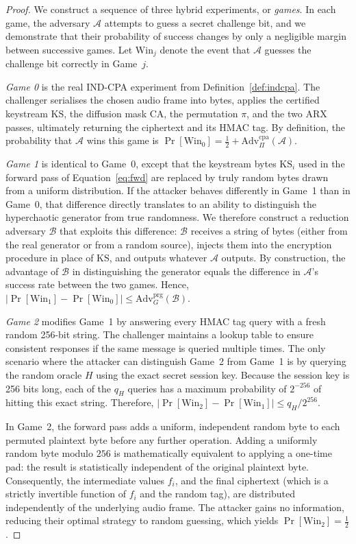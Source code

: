 \documentclass[pdflatex,sn-mathphys-num]{sn-jnl}%
\theoremstyle{thmstyleone}%
\theoremstyle{thmstyletwo}%
\theoremstyle{thmstylethree}%
\begin{document}
\begin{proof}
We construct a sequence of three hybrid experiments, or \emph{games}. In each game, the adversary $\mathcal{A}$ attempts to guess a secret challenge bit, and we demonstrate that their probability of success changes by only a negligible margin between successive games. Let $\mathrm{Win}_j$ denote the event that $\mathcal{A}$ guesses the challenge bit correctly in Game~$j$.

\emph{Game 0} is the real IND-CPA experiment from Definition~\ref{def:indcpa}. The challenger serialises the chosen audio frame into bytes, applies the certified keystream $\mathrm{KS}$, the diffusion mask $\mathrm{CA}$, the permutation $\pi$, and the two ARX passes, ultimately returning the ciphertext and its HMAC tag. By definition, the probability that $\mathcal{A}$ wins this game is $\Pr[\mathrm{Win}_0]=\tfrac12+\mathrm{Adv}^{\mathrm{cpa}}_{\Pi}(\mathcal{A})$.

\emph{Game 1} is identical to Game~0, except that the keystream bytes $\mathrm{KS}_i$ used in the forward pass of Equation~\eqref{eq:fwd} are replaced by truly random bytes drawn from a uniform distribution. If the attacker behaves differently in Game~1 than in Game~0, that difference directly translates to an ability to distinguish the hyperchaotic generator from true randomness. We therefore construct a reduction adversary $\mathcal{B}$ that exploits this difference: $\mathcal{B}$ receives a string of bytes (either from the real generator or from a random source), injects them into the encryption procedure in place of $\mathrm{KS}$, and outputs whatever $\mathcal{A}$ outputs. By construction, the advantage of $\mathcal{B}$ in distinguishing the generator equals the difference in $\mathcal{A}$'s success rate between the two games. Hence, $|\Pr[\mathrm{Win}_1]-\Pr[\mathrm{Win}_0]|\le \mathrm{Adv}^{\mathrm{prg}}_{G}(\mathcal{B})$.

\emph{Game 2} modifies Game~1 by answering every HMAC tag query with a fresh random 256-bit string. The challenger maintains a lookup table to ensure consistent responses if the same message is queried multiple times. The only scenario where the attacker can distinguish Game~2 from Game~1 is by querying the random oracle $H$ using the exact secret session key. Because the session key is 256 bits long, each of the $q_H$ queries has a maximum probability of $2^{-256}$ of hitting this exact string. Therefore, $|\Pr[\mathrm{Win}_2]-\Pr[\mathrm{Win}_1]|\le q_H/2^{256}$.

In Game~2, the forward pass adds a uniform, independent random byte to each permuted plaintext byte before any further operation. Adding a uniformly random byte modulo $256$ is mathematically equivalent to applying a one-time pad: the result is statistically independent of the original plaintext byte. Consequently, the intermediate values $f_i$, and the final ciphertext (which is a strictly invertible function of $f_i$ and the random tag), are distributed independently of the underlying audio frame. The attacker gains no information, reducing their optimal strategy to random guessing, which yields $\Pr[\mathrm{Win}_2]=\tfrac12$.


\end{proof}
\end{document}
